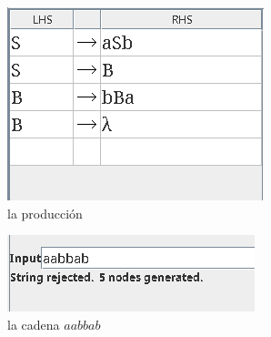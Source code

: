 \documentclass{article}
\begin{document}
\begin{flushleft}
\begin{enumerate}
                \begin{figure}[h] 
                    \centering
                    \begin{subfigure}[b]{0.45\textwidth}
                        \centering
                        \includegraphics[width=\textwidth]{./Imagenes/produccion2.png}
                        \caption{la producción}
                        \label{fig:label5}
                    \end{subfigure}
                    \hfill
                    \begin{subfigure}[b]{0.45\textwidth}
                        \centering
                        \includegraphics[width=\textwidth]{./Imagenes/grafo3.png}
                        \caption{la cadena $aabbab$}
                        \label{fig:label6}
                    \end{subfigure}
                    \vspace{0.5cm} 
                    \\
                    \begin{subfigure}[b]{0.45\textwidth}
                        \centering

\end{subfigure}
\end{figure}
\end{enumerate}
\end{flushleft}
\end{document}
